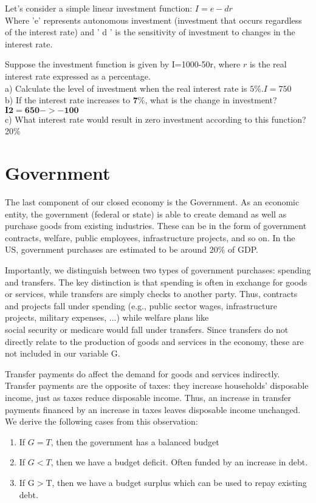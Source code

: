 \documentclass[10pt]{article}
\begin{document}
Let's consider a simple linear investment function: $I=e-d r$\\
Where 'e' represents autonomous investment (investment that occurs regardless of the interest rate) and ' d ' is the sensitivity of investment to changes in the interest rate.

Suppose the investment function is given by I=1000-50r, where $r$ is the real interest rate expressed as a percentage.\\
a) Calculate the level of investment when the real interest rate is $5 \% . I=750$\\
b) If the interest rate increases to $\mathbf{7 \%}$, what is the change in investment? $\mathbf{I 2}=\mathbf{6 5 0} \boldsymbol{- >} \mathbf{- 1 0 0}$\\
c) What interest rate would result in zero investment according to this function? 20\%

\section*{Government}
The last component of our closed economy is the Government. As an economic entity, the government (federal or state) is able to create demand as well as purchase goods from existing industries. These can be in the form of government contracts, welfare, public employees, infrastructure projects, and so on. In the US, government purchases are estimated to be around $20 \%$ of GDP.

Importantly, we distinguish between two types of government purchases: spending and transfers. The key distinction is that spending is often in exchange for goods or services, while transfers are simply checks to another party. Thus, contracts and projects fall under spending (e.g., public sector wages, infrastructure projects, military expenses, ...) while welfare plans like\\
social security or medicare would fall under transfers. Since transfers do not directly relate to the production of goods and services in the economy, these are not included in our variable G.

Transfer payments do affect the demand for goods and services indirectly. Transfer payments are the opposite of taxes: they increase households' disposable income, just as taxes reduce disposable income. Thus, an increase in transfer payments financed by an increase in taxes leaves disposable income unchanged. We derive the following cases from this observation:

\begin{enumerate}
  \item If $G=T$, then the government has a balanced budget
  \item If $G<T$, then we have a budget deficit. Often funded by an increase in debt.
  \item If $\mathrm{G}>\mathrm{T}$, then we have a budget surplus which can be used to repay existing debt.
\end{enumerate}
\end{document}
